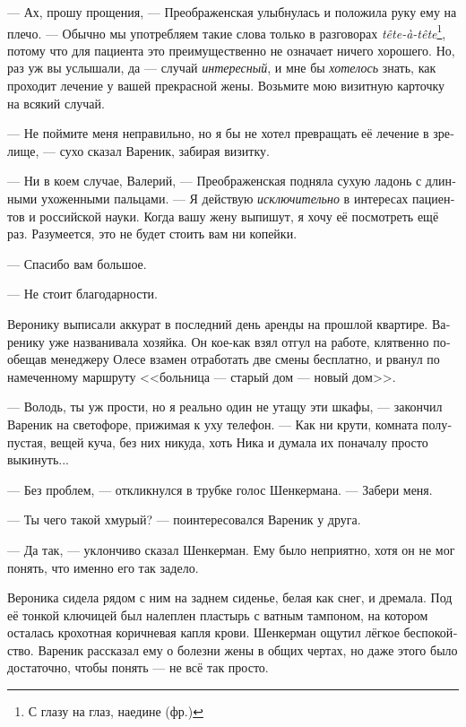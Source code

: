 \documentclass[a5paper,12pt,fleqn]{extbook}\usepackage{cooltooltips}\usepackage{polyglossia}\setdefaultlanguage[babelshorthands=true]{russian}\setotherlanguage{english}\defaultfontfeatures{Ligatures=TeX,Mapping=tex-text} \usepackage{xcolor}\definecolor{lightgray}{HTML}{bbbbbb}\color{lightgray}\newcommand{\ml}[3]{\textenglish{\textcolor{black}{#3}}}
\newcommand{\asterism}{\vspace{1em}{\centering\Large\bfseries$\ast~\ast~\ast$\par}\vspace{1em}}
\newcommand{\textspace}{\vspace{1em}{\centering\Large\bfseries<...>\par}\vspace{1em}}
\begin{document}
--- Ах, прошу прощения, --- Преображенская улыбнулась и положила руку ему на плечо.
--- Обычно мы употребляем такие слова только в разговорах \textit{tête-à-tête}\footnote{С глазу на глаз, наедине (фр.)}, потому что для пациента это преимущественно не означает ничего хорошего.
Но, раз уж вы услышали, да --- случай \emph{интересный}, и мне бы \emph{хотелось} знать, как проходит лечение у вашей прекрасной жены.
Возьмите мою визитную карточку на всякий случай.

--- Не поймите меня неправильно, но я бы не хотел превращать её лечение в зрелище, --- сухо сказал Вареник, забирая визитку.

--- Ни в коем случае, Валерий, --- Преображенская подняла сухую ладонь с длинными ухоженными пальцами.
--- Я действую \emph{исключительно} в интересах пациентов и российской науки.
Когда вашу жену выпишут, я хочу её посмотреть ещё раз.
Разумеется, это не будет стоить вам ни копейки.

--- Спасибо вам большое.

--- Не стоит благодарности.

\textspace

\asterism

Веронику выписали аккурат в последний день аренды на прошлой квартире.
Варенику уже названивала хозяйка.
Он кое-как взял отгул на работе, клятвенно пообещав менеджеру Олесе взамен отработать две смены бесплатно, и рванул по намеченному маршруту <<больница --- старый дом --- новый дом>>.

--- Володь, ты уж прости, но я реально один не утащу эти шкафы, --- закончил Вареник на светофоре, прижимая к уху телефон.
--- Как ни крути, комната полупустая, вещей куча, без них никуда, хоть Ника и думала их поначалу просто выкинуть...

--- Без проблем, --- откликнулся в трубке голос Шенкермана.
--- Забери меня.

--- Ты чего такой хмурый? --- поинтересовался Вареник у друга.

--- Да так, --- уклончиво сказал Шенкерман.
Ему было неприятно, хотя он не мог понять, что именно его так задело.

Вероника сидела рядом с ним на заднем сиденье, белая как снег, и дремала.
Под её тонкой ключицей был налеплен пластырь с ватным тампоном, на котором осталась крохотная коричневая капля крови.
Шенкерман ощутил лёгкое беспокойство.
Вареник рассказал ему о болезни жены в общих чертах, но даже этого было достаточно, чтобы понять --- не всё так просто.
\end{document}
